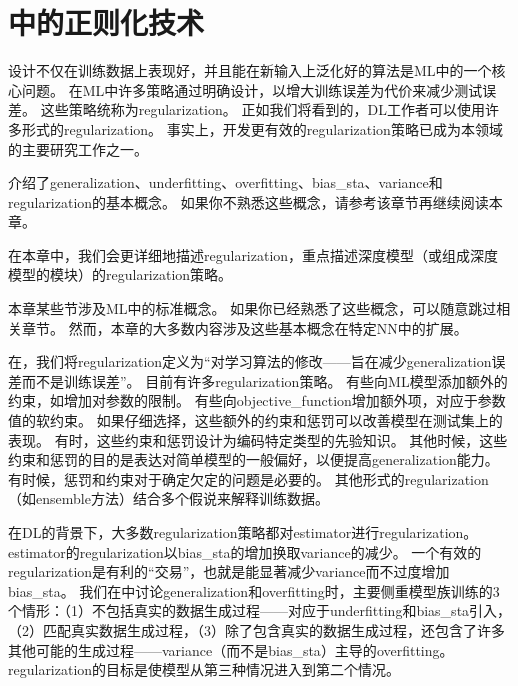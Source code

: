 \chapter{中的正则化技术}
\label{chap:regularization_for_deep_learning}
设计不仅在训练数据上表现好，并且能在新输入上泛化好的算法是\gls{ML}中的一个核心问题。
在\gls{ML}中许多策略通过明确设计，以增大训练误差为代价来减少测试误差。
这些策略统称为\gls{regularization}。
正如我们将看到的，\gls{DL}工作者可以使用许多形式的\gls{regularization}。
事实上，开发更有效的\gls{regularization}策略已成为本领域的主要研究工作之一。

介绍了\gls{generalization}、\gls{underfitting}、\gls{overfitting}、\gls{bias_sta}、\gls{variance}和\gls{regularization}的基本概念。
如果你不熟悉这些概念，请参考该章节再继续阅读本章。

在本章中，我们会更详细地描述\gls{regularization}，重点描述深度模型（或组成深度模型的模块）的\gls{regularization}策略。

本章某些节涉及\gls{ML}中的标准概念。
如果你已经熟悉了这些概念，可以随意跳过相关章节。
然而，本章的大多数内容涉及这些基本概念在特定\gls{NN}中的扩展。

在，我们将\gls{regularization}定义为``对学习算法的修改——旨在减少\gls{generalization}误差而不是训练误差''。
目前有许多\gls{regularization}策略。
有些向\gls{ML}模型添加额外的约束，如增加对参数的限制。
有些向\gls{objective_function}增加额外项，对应于参数值的软约束。
如果仔细选择，这些额外的约束和惩罚可以改善模型在测试集上的表现。
有时，这些约束和惩罚设计为编码特定类型的先验知识。
其他时候，这些约束和惩罚的目的是表达对简单模型的一般偏好，以便提高\gls{generalization}能力。
有时候，惩罚和约束对于确定欠定的问题是必要的。
其他形式的\gls{regularization}（如\gls{ensemble}方法）结合多个假说来解释训练数据。


在\gls{DL}的背景下，大多数\gls{regularization}策略都对\gls{estimator}进行\gls{regularization}。
\gls{estimator}的\gls{regularization}以\gls{bias_sta}的增加换取\gls{variance}的减少。
一个有效的\gls{regularization}是有利的``交易''，也就是能显著减少\gls{variance}而不过度增加\gls{bias_sta}。
我们在中讨论\gls{generalization}和\gls{overfitting}时，主要侧重模型族训练的3个情形：（1）不包括真实的数据生成过程——对应于\gls{underfitting}和\gls{bias_sta}引入，（2）匹配真实数据生成过程，（3）除了包含真实的数据生成过程，还包含了许多其他可能的生成过程——\gls{variance}（而不是\gls{bias_sta}）主导的\gls{overfitting}。
\gls{regularization}的目标是使模型从第三种情况进入到第二个情况。

